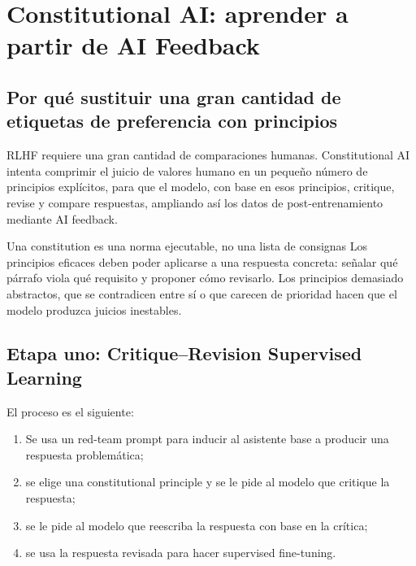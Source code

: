 \section{Constitutional AI: aprender a partir de AI Feedback}

\subsection{Por qué sustituir una gran cantidad de etiquetas de preferencia con principios}

RLHF requiere una gran cantidad de comparaciones humanas. Constitutional AI intenta comprimir el juicio de valores humano en un pequeño número de principios explícitos, para que el modelo, con base en esos principios, critique, revise y compare respuestas, ampliando así los datos de post-entrenamiento mediante AI feedback.


\begin{knowledgebox}{Una constitution es una norma ejecutable, no una lista de consignas}
Los principios eficaces deben poder aplicarse a una respuesta concreta: señalar qué párrafo viola qué requisito y proponer cómo revisarlo. Los principios demasiado abstractos, que se contradicen entre sí o que carecen de prioridad hacen que el modelo produzca juicios inestables.
\end{knowledgebox}

\subsection{Etapa uno: Critique--Revision Supervised Learning}

El proceso es el siguiente:

\begin{enumerate}
    \item Se usa un red-team prompt para inducir al asistente base a producir una respuesta problemática;
    \item se elige una constitutional principle y se le pide al modelo que critique la respuesta;
    \item se le pide al modelo que reescriba la respuesta con base en la crítica;
    \item se usa la respuesta revisada para hacer supervised fine-tuning.
\end{enumerate}

